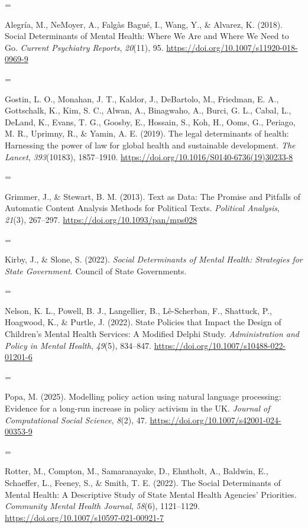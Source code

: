 \documentclass[10pt,twocolumn]{article}
\newlength{\cslhangindent}
\newenvironment{CSLReferences}[2] %
 {%
  \fontsize{9}{11}\selectfont  %
  \setlength{\parindent}{0pt}
  \ifodd #1
   \let\oldpar\par
   \def\par{\hangindent=\cslhangindent\oldpar}
  \fi
  \setlength{\parskip}{#2\baselineskip}
  \renewcommand{\bibitem}[2][]{\par}
 }%
 {}
\begin{document}
\label{refs}
\begin{CSLReferences}{1}{0}
\bibitem[\citeproctext]{ref-alegriaSocialDeterminantsMental2018}
Alegría, M., NeMoyer, A., Falgàs Bagué, I., Wang, Y., \& Alvarez, K.
(2018). Social {Determinants} of {Mental Health}: {Where We Are} and
{Where We Need} to {Go}. \emph{Current Psychiatry Reports},
\emph{20}(11), 95. \url{https://doi.org/10.1007/s11920-018-0969-9}

\bibitem[\citeproctext]{ref-gostinLegalDeterminantsHealth2019}
Gostin, L. O., Monahan, J. T., Kaldor, J., DeBartolo, M., Friedman, E.
A., Gottschalk, K., Kim, S. C., Alwan, A., Binagwaho, A., Burci, G. L.,
Cabal, L., DeLand, K., Evans, T. G., Goosby, E., Hossain, S., Koh, H.,
Ooms, G., Periago, M. R., Uprimny, R., \& Yamin, A. E. (2019). The legal
determinants of health: Harnessing the power of law for global health
and sustainable development. \emph{The Lancet}, \emph{393}(10183),
1857--1910. \url{https://doi.org/10.1016/S0140-6736(19)30233-8}

\bibitem[\citeproctext]{ref-grimmerTextDataPromise2013}
Grimmer, J., \& Stewart, B. M. (2013). Text as {Data}: {The Promise} and
{Pitfalls} of {Automatic Content Analysis Methods} for {Political
Texts}. \emph{Political Analysis}, \emph{21}(3), 267--297.
\url{https://doi.org/10.1093/pan/mps028}

\bibitem[\citeproctext]{ref-kirbySOCIALDETERMINANTSMENTAL}
Kirby, J., \& Slone, S. (2022). \emph{Social {Determinants} of {Mental
Health}: {Strategies} for {State Government}}. Council of State
Governments.

\bibitem[\citeproctext]{ref-nelsonStatePoliciesThat2022}
Nelson, K. L., Powell, B. J., Langellier, B., Lê-Scherban, F., Shattuck,
P., Hoagwood, K., \& Purtle, J. (2022). State {Policies} that {Impact}
the {Design} of {Children}'s {Mental Health Services}: {A Modified
Delphi Study}. \emph{Administration and Policy in Mental Health},
\emph{49}(5), 834--847. \url{https://doi.org/10.1007/s10488-022-01201-6}

\bibitem[\citeproctext]{ref-popaModellingPolicyAction2025}
Popa, M. (2025). Modelling policy action using natural language
processing: Evidence for a long-run increase in policy activism in the
{UK}. \emph{Journal of Computational Social Science}, \emph{8}(2), 47.
\url{https://doi.org/10.1007/s42001-024-00353-9}

\bibitem[\citeproctext]{ref-rotterSocialDeterminantsMental2022}
Rotter, M., Compton, M., Samaranayake, D., Ehntholt, A., Baldwin, E.,
Schaeffer, L., Feeney, S., \& Smith, T. E. (2022). The {Social
Determinants} of {Mental Health}: {A Descriptive Study} of {State Mental
Health Agencies}' {Priorities}. \emph{Community Mental Health Journal},
\emph{58}(6), 1121--1129.
\url{https://doi.org/10.1007/s10597-021-00921-7}


\end{CSLReferences}
\end{document}
